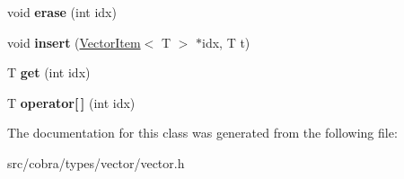 \begin{DoxyCompactItemize}
\item 
\hypertarget{class_cobra_1_1internal_1_1_vector_a40d81bf440a7982fb78b22523faeef5f}{void {\bfseries erase} (int idx)}\label{class_cobra_1_1internal_1_1_vector_a40d81bf440a7982fb78b22523faeef5f}

\item 
\hypertarget{class_cobra_1_1internal_1_1_vector_a8f7e8dce35c1ba4c0e05ad59ad0a39fd}{void {\bfseries insert} (\hyperlink{class_cobra_1_1internal_1_1_vector_item}{Vector\+Item}$<$ T $>$ $\ast$idx, T t)}\label{class_cobra_1_1internal_1_1_vector_a8f7e8dce35c1ba4c0e05ad59ad0a39fd}

\item 
\hypertarget{class_cobra_1_1internal_1_1_vector_a19db6569109345339ee83ece0ee08593}{T {\bfseries get} (int idx)}\label{class_cobra_1_1internal_1_1_vector_a19db6569109345339ee83ece0ee08593}

\item 
\hypertarget{class_cobra_1_1internal_1_1_vector_a3aaa0f1583c1e9c39936000bf8024b06}{T {\bfseries operator\mbox{[}$\,$\mbox{]}} (int idx)}\label{class_cobra_1_1internal_1_1_vector_a3aaa0f1583c1e9c39936000bf8024b06}

\end{DoxyCompactItemize}


The documentation for this class was generated from the following file\+:\begin{DoxyCompactItemize}
\item 
src/cobra/types/vector/vector.\+h\end{DoxyCompactItemize}
